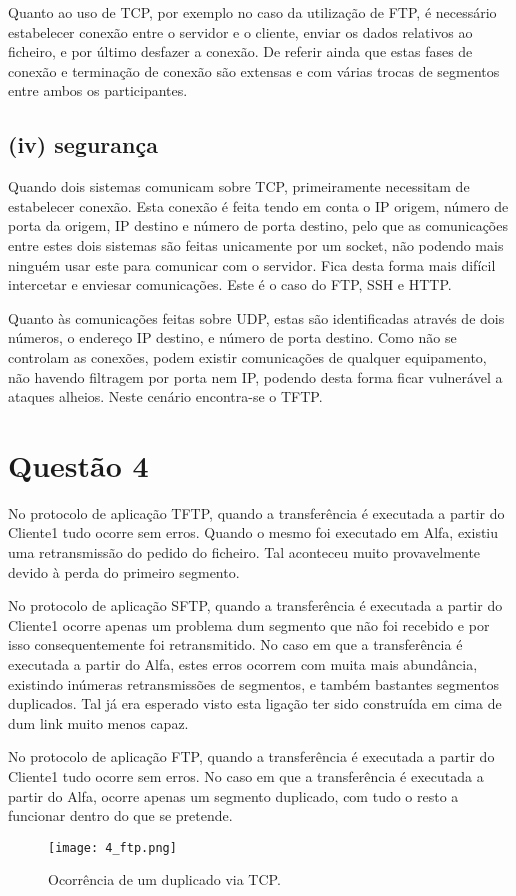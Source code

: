 \documentclass{llncs}
\begin{document}
Quanto ao uso de TCP, por exemplo no caso da utilização de FTP, é necessário estabelecer conexão entre o servidor e o cliente, enviar os dados relativos ao ficheiro, e por último desfazer a conexão. De referir ainda que estas fases de conexão e terminação de conexão são extensas e com várias trocas de segmentos entre ambos os participantes.

\subsection{(iv) segurança}
Quando dois sistemas comunicam sobre TCP, primeiramente necessitam de estabelecer conexão. Esta conexão é feita tendo em conta o IP origem, número de porta da origem, IP destino e número de porta destino, pelo que as comunicações entre estes dois sistemas são feitas unicamente por um socket, não podendo mais ninguém usar este para comunicar com o servidor. Fica desta forma mais difícil intercetar e enviesar comunicações. Este é o caso do FTP, SSH e HTTP.

Quanto às comunicações feitas sobre UDP, estas são identificadas através de dois números, o endereço IP destino, e número de porta destino. Como não se controlam as conexões, podem existir comunicações de qualquer equipamento, não havendo filtragem por porta nem IP, podendo desta forma ficar vulnerável a ataques alheios. Neste cenário encontra-se o TFTP.


\section{Questão 4}
No protocolo de aplicação TFTP, quando a transferência é executada a partir do Cliente1 tudo ocorre sem erros. Quando o mesmo foi executado em Alfa, existiu uma retransmissão do pedido do ficheiro. Tal aconteceu muito provavelmente devido à perda do primeiro segmento.

No protocolo de aplicação SFTP, quando a transferência é executada a partir do Cliente1 ocorre apenas um problema dum segmento que não foi recebido e por isso consequentemente foi retransmitido. No caso em que a transferência é executada a partir do Alfa, estes erros ocorrem com muita mais abundância, existindo inúmeras retransmissões de segmentos, e também bastantes segmentos duplicados. Tal já era esperado visto esta ligação ter sido construída em cima de dum link muito menos capaz.

No protocolo de aplicação FTP, quando a transferência é executada a partir do Cliente1 tudo ocorre sem erros. No caso em que a transferência é executada a partir do Alfa, ocorre apenas um segmento duplicado, com tudo o resto a funcionar dentro do que se pretende.
\begin{figure}[H]
\begin{center}
\texttt{[image: 4\_ftp.png]}
\end{center}
\caption{\label{fig:ssh}Ocorrência de um duplicado via TCP.}
\end{figure}
\end{document}
